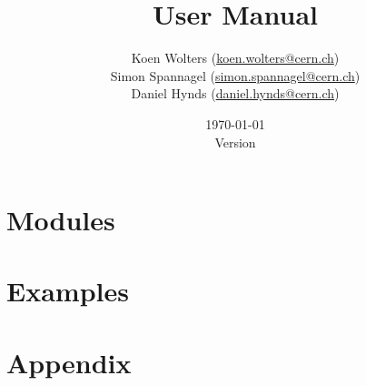 \documentclass[captions=tableheading,a4paper,11pt,numbers=noenddot,titlepage,twoside,openright,DIV=14,BCOR=8mm,parskip=half]{scrbook}
\title{\apsqbold User Manual} %
\author{Koen Wolters (\href{mailto:koen.wolters@cern.ch}{koen.wolters@cern.ch})\\
  Simon Spannagel (\href{mailto:simon.spannagel@cern.ch}{simon.spannagel@cern.ch})\\
  Daniel Hynds (\href{mailto:daniel.hynds@cern.ch}{daniel.hynds@cern.ch})
} %
\date{\today\\ \vspace{10pt} Version \version} %
\begin{document}
\begin{titlepage}
\maketitle %

\addlicense
\end{titlepage}

\cleardoublepage
\tableofcontents

\cleardoublepage


\cleardoublepage


\cleardoublepage


\cleardoublepage


\cleardoublepage


\cleardoublepage


\cleardoublepage

\chapter{Modules}
\label{sec:modules}

\lstset{language=Ini}
\lstset{language=}
\cleardoublepage

\chapter{Examples}
\label{sec:examples}

\lstset{language=Ini}
\lstset{language=}
\cleardoublepage


\cleardoublepage


\cleardoublepage


\cleardoublepage


\cleardoublepage


\cleardoublepage

\appendix
\chapter{Appendix}

% 

\cleardoublepage
{}
{}
\printbibliography
\end{document}
